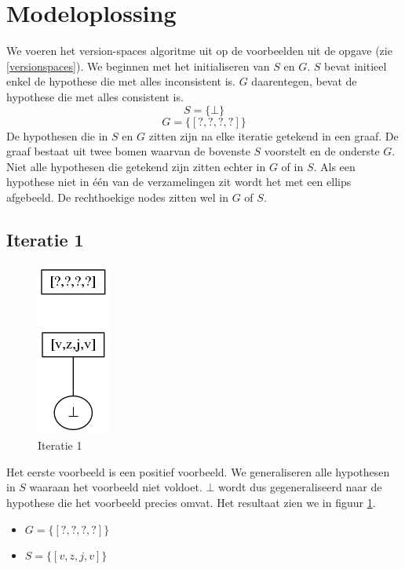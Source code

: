 \documentclass[alternative-exam.tex]{subfiles}
\begin{document}
\section{Modeloplossing}
We voeren het version-spaces algoritme uit op de voorbeelden uit de opgave (zie \ref{versionspaces}). We beginnen met het initialiseren van $S$ en $G$. $S$ bevat initieel enkel de hypothese die met alles inconsistent is. $G$ daarentegen, bevat de hypothese die met alles consistent is.
\[
S = \{\bot\}
\]
\[
G = \{[?,?,?,?]\}
\]
De hypothesen die in $S$ en $G$ zitten zijn na elke iteratie getekend in een graaf. De graaf bestaat uit twee bomen waarvan de bovenste $S$ voorstelt en de onderste $G$. Niet alle hypothesen die getekend zijn zitten echter in $G$ of in $S$. Als een hypothese niet in \'e\'en van de verzamelingen zit wordt het met een ellips afgebeeld. De rechthoekige nodes zitten wel in $G$ of $S$.
\subsection{Iteratie 1}
\begin{figure}
[H]
\centering
\caption{Iteratie 1}
\label{iter_1}
\includegraphics[scale=0.5]{resources/graphs/iteration_1.png}
\end{figure}
Het eerste voorbeeld is een positief voorbeeld. We generaliseren alle hypothesen in $S$ waaraan het voorbeeld niet voldoet. $\bot$ wordt dus gegeneraliseerd naar de hypothese die het voorbeeld precies omvat. Het resultaat zien we in figuur \ref{iter_1}.
\begin{itemize}
\item $G = \{[?,?,?,?]\}$
\item $S = \{[v,z,j,v]\}$
\end{itemize}
\end{document}
